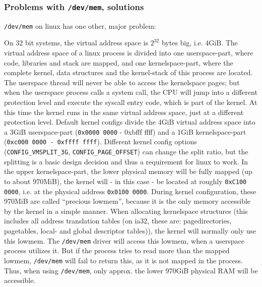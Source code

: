 \subsubsection{Problems with \texttt{/dev/mem}, solutions}

\texttt{/dev/mem} on linux has one other, major problem:

On 32 bit systems, the virtual address space is $2^{32}$ bytes big, i.e. 4GiB.
The virtual address space of a linux process is divided into one userspace-part,
where code, libraries and stack are mapped, and one kernelspace-part, where the
complete kernel, data structures and the kernel-stack of this process are
located. The userspace thread will never be able to access the kernelspace
pages; but when the userspace process calls a system call, the CPU will jump
into a different protection level and execute the syscall entry code, which is
part of the kernel. At this time the kernel runs in the same virtual address
space, just at a different protection level. Default kernel configs divide the
4GiB virtual address space into a 3GiB userspace-part (\texttt{0x0000 0000} -
{0xbfff ffff}) and a 1GiB kernelspace-part (\texttt{0xc000 0000 - 0xffff ffff}).
Different kernel config options (\texttt{CONFIG\_VMSPLIT\_3G},
\texttt{CONFIG\_PAGE\_OFFSET}) can change the split ratio, but the splitting is
a basic design decision and thus a requirement for linux to work. In the upper
kernelspace-part, the lower physical memory will be fully mapped (up to about
970MiB), the kernel will - in this case - be located at roughly \texttt{0xC100
0000}, i.e. at the physical address \texttt{0x0100 0000}. During kernel
configuration, these 970MiB are called ``precious lowmem'', because it is the
only memory accessible by the kernel in a simple manner. When allocating
kernelspace structures (this includes all address translation tables (on ia32,
these are: pagedirectories, pagetables, local- and global descriptor
tables)\label{linuxATTinlowmem}), the kernel will normally only use this lowmem.
The \texttt{/dev/mem} driver will access this lowmem, when a userspace process
utilizes it. But if the process tries to read more than the mapped lowmem,
\texttt{/dev/mem} will fail to return this, as it is not mapped in the process.
Thus, when using \texttt{/dev/mem}, only approx.  the lower 970GiB physical RAM
will be accessible.

